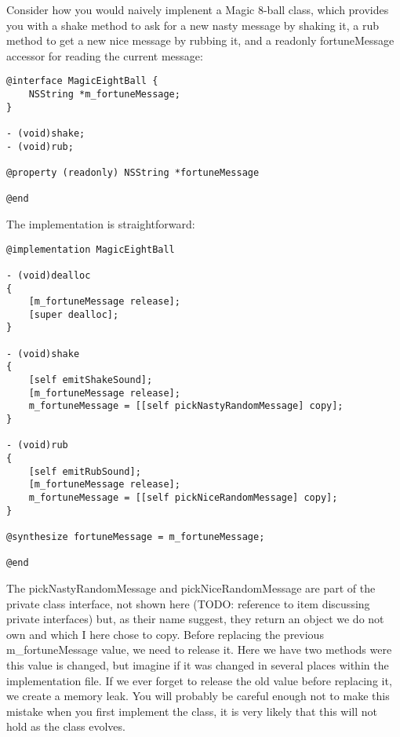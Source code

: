 Consider how you would naively implenent a Magic 8-ball class, which provides you with a shake method to ask for a new nasty message by shaking it, a rub method to get a new nice message by rubbing it, and a readonly fortuneMessage accessor for reading the current message:
\begin{lstlisting}[frame=single, caption={MagicEightBall.h}]
@interface MagicEightBall {
    NSString *m_fortuneMessage;
}

- (void)shake;
- (void)rub;

@property (readonly) NSString *fortuneMessage

@end
\end{lstlisting}
The implementation is straightforward:
\begin{lstlisting}[frame=single, caption={MagicEightBall.m}]
@implementation MagicEightBall

- (void)dealloc
{
    [m_fortuneMessage release];
    [super dealloc];
}

- (void)shake
{
    [self emitShakeSound];
    [m_fortuneMessage release];
    m_fortuneMessage = [[self pickNastyRandomMessage] copy];
}

- (void)rub
{
    [self emitRubSound];
    [m_fortuneMessage release];
    m_fortuneMessage = [[self pickNiceRandomMessage] copy];
}

@synthesize fortuneMessage = m_fortuneMessage;

@end
\end{lstlisting}
The pickNastyRandomMessage and pickNiceRandomMessage are part of the private class interface, not shown here (TODO: reference to item discussing private interfaces) but, as their name suggest, they return an object we do not own and which I here chose to copy. Before replacing the previous m_fortuneMessage value, we need to release it. Here we have two methods were this value is changed, but imagine if it was changed in several places within the implementation file. If we ever forget to release the old value before replacing it, we create a memory leak. You will probably be careful enough not to make this mistake when you first implement the class, it is very likely that this will not hold as the class evolves.

